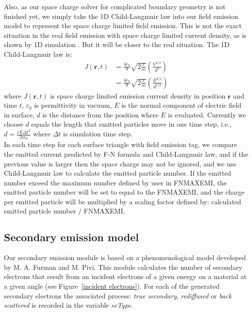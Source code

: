 \documentclass[a4paper,11pt]{article}
\begin{document}
Also, as our space charge solver for complicated boundary geometry is not finished yet, we simply take the 1D Child-Langmuir law into our field emission model to represent the space charge limited field emission. This is not the exact situation in the real field emission with space charge limited current density, as is shown by 1D simulation \cite{BC}. But it will be closer to the real situation. The 1D Child-Langmuir law is: \\ 
\begin{align*}
J(\mathbf{r},t) & =\frac{4\varepsilon_0}{9}\sqrt{2\frac{e}{m}}(\frac{V^{3/2}}{d^2})\\
 & =\frac{4\varepsilon_0}{9}\sqrt{2\frac{e}{m}}(\frac{E^{3/2}}{d^{1/2}})
\end{align*}
 where $J(\mathbf{r},t)$ is space charge limited emission current density in position $\mathbf{r}$ and time $t$, $\varepsilon_0$ is permittivity in vacuum, $E$ is the normal component of electric field in surface, $d$ is the distance from the position where $E$ is evaluated. Currently we choose $d$ equals the length that emitted particles move in one time step, i.e., $d=\frac{eE\Delta{t}^2}{2m_0}$ where $\Delta{t}$ is simulation time step.\\ 

In each time step for each surface triangle with field emission tag, we compare the emitted current predicted by F-N formula and Child-Langmuir law, and if the previous value is larger then the space charge may not be ignored, and we use Child-Langmuir law to calculate the emitted particle number. If the emitted number exceed the maximum number defined by user in FNMAXEMI, the emitted particle number will be set to equal to the FNMAXEMI, and the charge per emitted particle will be multiplied by a scaling factor defined by: calculated emitted particle number $/$ FNMAXEMI.\\   

\subsection{Secondary emission model}

Our secondary emission module is based on a phenomenological model developed by M. A. Furman and M. Pivi\cite{SE}. This module calculates the number of secondary electrons that
result from an incident electrons of a given energy on a material
at a given angle (see Figure~\ref{incident electrons}). For each of
the generated secondary electrons the associated process: {\em true secondary}, {\em rediffused} or
{\em back scattered} is recorded in the variable {\it seType}. 
\end{document}
